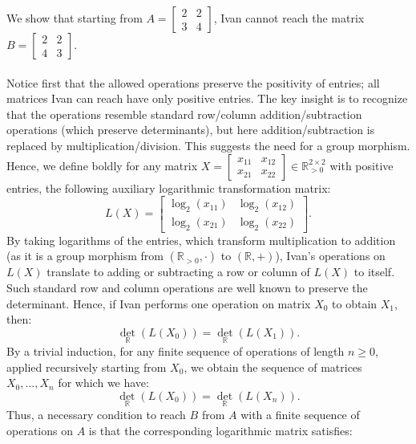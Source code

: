 \begin{solution}
    We show that starting from \( A = \begin{bmatrix} 2 & 2 \\ 3 & 4 \end{bmatrix} \), Ivan cannot reach the matrix \( B = \begin{bmatrix} 2 & 2 \\ 4 & 3 \end{bmatrix} \).
    \\\\
    Notice first that the allowed operations preserve the positivity of entries; all matrices Ivan can reach have only positive entries. The key insight is to recognize that the operations resemble standard row/column addition/subtraction operations (which preserve determinants), but here addition/subtraction is replaced by multiplication/division. This suggests the need for a group morphism. Hence, we define boldly for any matrix \( X = \begin{bmatrix} x_{11} & x_{12} \\ x_{21} & x_{22} \end{bmatrix} \in \mathbb{R}_{>0}^{2 \times 2} \) with positive entries, the following auxiliary logarithmic transformation matrix:
    \[
        L\left(X\right) = \begin{bmatrix} \log_2\left(x_{11}\right) & \log_2\left(x_{12}\right) \\ \log_2\left(x_{21}\right) & \log_2\left(x_{22}\right) \end{bmatrix}.
    \]
    By taking logarithms of the entries, which transform multiplication to addition (as it is a group morphism from \( \left(\mathbb{R}_{>0},\cdot\right) \) to \( \left(\mathbb{R},+\right) \)), Ivan's operations on \( L\left(X\right) \) translate to adding or subtracting a row or column of \( L\left(X\right) \) to itself. Such standard row and column operations are well known to preserve the determinant. Hence, if Ivan performs one operation on matrix \( X_0 \) to obtain \( X_1 \), then:
    \[
        {\det}_{\mathbb{R}}\left(L\left(X_0\right)\right)= {\det}_{\mathbb{R}}\left(L\left(X_1\right)\right).
    \]
    By a trivial induction, for any finite sequence of operations of length \( n \geq 0 \), applied recursively starting from \( X_0 \), we obtain the sequence of matrices \( X_0, \dots, X_n \) for which we have:
    \[
        {\det}_{\mathbb{R}}\left(L\left(X_0\right)\right)= {\det}_{\mathbb{R}}\left(L\left(X_n\right)\right).
    \]
    Thus, a necessary condition to reach \( B \) from \( A \) with a finite sequence of operations on \( A \) is that the corresponding logarithmic matrix satisfies:

\end{solution}
